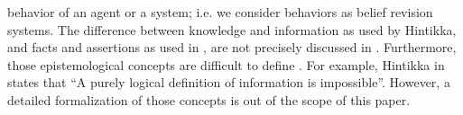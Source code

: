 \documentclass[conference]{IEEEtran}
\begin{document}
behavior of an agent or a system; i.e. we consider behaviors as belief revision
systems.
The difference between knowledge and information as used by Hintikka, and facts
and assertions as used in \autocite{Santaca2016abf}, are not precisely discussed
in \autocite{Santaca2016abf}.  Furthermore, those epistemological concepts are
difficult to define
\autocite{Gettier2012knowledge}.
For example, Hintikka in
\autocite{Hintikka1993Information} states that ``A purely logical definition of
information is impossible''. However, a detailed formalization of those concepts is out
of the scope of this paper. 
\end{document}
